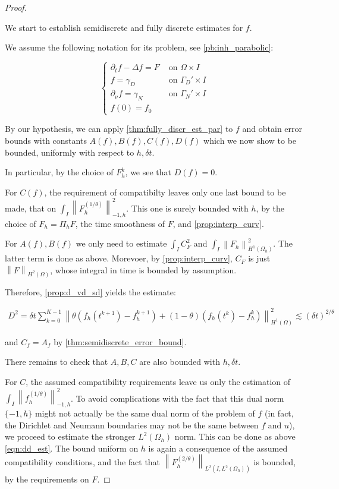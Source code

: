 \documentclass[english,a4paper,10pt,oneside]{scrbook}	%
\theoremstyle{break}
\newenvironment{mproof}[1][\proofname]{%
  \begin{proof}[#1]$ $\par\nobreak\ignorespaces
}{%
  \end{proof}
}
\renewcommand*{\proofname}{Proof}
\theoremstyle{remark}
\newcommand{\ds}{\displaystyle}
\newcommand{\norm}[1]{\left\lVert#1\right\rVert}
\begin{document}
\begin{mproof}

We start to establish semidiscrete and fully discrete estimates for $f$.

We assume the following notation for its problem, see \cref{pb:inh_parabolic}:

$$
\left\{\begin{matrix}
\partial_t f-\Delta f = F & \text{ on } \Omega \times I \\ 
f = \gamma_D & \text{ on } \Gamma_D' \times I\\ 
\partial_\nu f = \gamma_N & \text{ on } \Gamma_N' \times I \\
f(0) =  f_0
\end{matrix}\right.
$$

By our hypothesis, we can apply \cref{thm:fully_discr_est_par} to $f$ and obtain error bounds with constants $A(f), B(f), C(f), D(f)$ which we now show to be bounded, uniformly with respect to $h, \delta t$.

In particular, by the choice of $F_h^k$, we see that $D(f)=0$.

For $C(f)$, the requirement of compatibilty leaves only one last bound to be made, that on $\ds \int_I\norm{F_h^{(1/\theta)}}_{-1,h}^2$. This one is surely bounded with $h$, by the choice of $F_h=\Pi_h F$, the time smoothness of $F$, and \cref{prop:interp_curv}.

For $A(f), B(f)$ we only need to estimate $\ds \int_I C_F^2$ and $\ds \int_I \norm{F_h}_{H^1(\Omega_h)}^2$. The latter term is done as above. Morevoer, by \cref{prop:interp_curv}, $C_F$ is just $\norm{F}_{H^2(\Omega)}$, whose integral in time is bounded by assumption.

Therefore, \cref{prop:d_vd_sd} yields the estimate:

\begin{align*}
	D^2 = \delta t \sum_{k=0}^{K-1} \norm{\theta(f_h(t^{k+1}) - f_h^{k+1}) + (1-\theta)(f_h(t^{k}) - f_h^{k})}_{H^1(\Omega)}^2 \lesssim (\delta t)^{2/\theta}
\end{align*}

and $C_f = A_f$ by \cref{thm:semidiscrete_error_bound}.

There remains to check that $A, B, C$ are also bounded with $h, \delta t$.

For $C$, the assumed compatibility requirements leave us only the estimation of $\ds\int_I\norm{f_h^{(1/\theta)}}_{-1,h}^2$. To avoid complications with the fact that  this dual norm $\{-1,h\}$ might not actually be the same dual norm of the problem of $f$ (in fact, the Dirichlet and Neumann boundaries may not be the same between $f$ and $u$), we proceed to estimate the stronger $L^2(\Omega_h)$ norm. This can be done as above \cref{eqn:dd_est}. The bound uniform on $h$ is again a consequence of the assumed compatibility conditions, and the fact that $\norm{F_h^{(2/\theta)}}_{L^2(I,L^2(\Omega_h))} $ is bounded, by the requirements on $F$.


\end{mproof}
\end{document}

